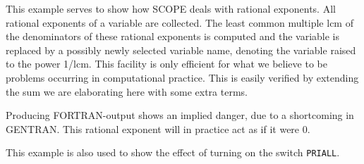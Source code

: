 \example\label{ex:2.2.6}

This example serves to show how SCOPE deals with rational exponents.
All rational exponents of a variable are collected. The least common
multiple lcm of the denominators of these rational exponents is
computed and the variable is replaced by a possibly newly selected
variable name, denoting the variable raised to the power 1/lcm. This
facility is only efficient for what we believe to be problems
occurring in computational practice. This is easily verified by
extending the sum we are elaborating here with some extra terms.

Producing FORTRAN-output shows an implied danger, due to a shortcoming
in GENTRAN. This rational exponent will in practice act as if it were
0.

This example is also used to show the effect of turning on the switch
{\tt PRIALL}.
